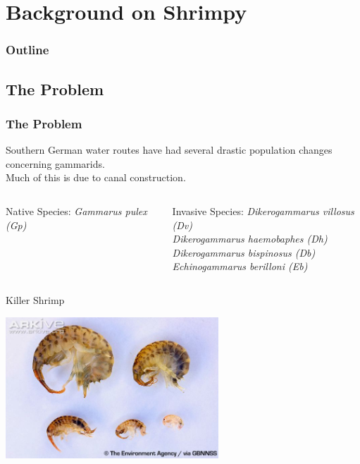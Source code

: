 \section{Background on Shrimpy}


\begin{frame}
  \frametitle{Outline}
  \tableofcontents[ currentsection ]
\end{frame}

\subsection{The Problem}

\begin{frame}
  \frametitle{The Problem}

  Southern German water routes have had several drastic population changes concerning gammarids. \\
\vspace{1em}
Much of this is due to canal construction. 

  \begin{columns}[t]
	\begin{block}{Native Species:}
	\textit{Gammarus pulex (Gp)}
	\end{block}

	\begin{block}{Invasive Species:}
    	\textit{Dikerogammarus villosus (Dv)}\\	
	\textit{Dikerogammarus haemobaphes (Dh)}\\
	\textit{Dikerogammarus bispinosus (Db)}\\
	\textit{Echinogammarus berilloni (Eb)}
	\end{block}
  \end{columns}
\end{frame}

\begin{frame}{Killer Shrimp}
\centerline{\includegraphics[width=8cm]{shrimpy1}}
\end{frame}


